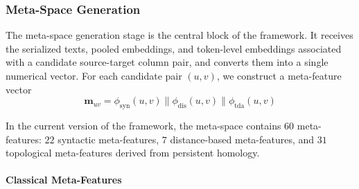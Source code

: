 \documentclass[sigconf, nonacm]{acmart}
\newcommand{\concat}{\mathbin{\|}}
\begin{document}
\subsubsection{\textbf{Meta-Space Generation}}

The meta-space generation stage is the central block of the framework. It receives the serialized texts, pooled embeddings, and token-level embeddings associated with a candidate source-target column pair, and converts them into a single numerical vector. For each candidate pair \((u,v)\), we construct a meta-feature vector
\[
\mathbf{m}_{uv}=
\phi_{\mathrm{syn}}(u,v)
\concat
\phi_{\mathrm{dis}}(u,v)
\concat
\phi_{\mathrm{tda}}(u,v)
\]

In the current version of the framework, the meta-space contains \(60\) meta-features: \(22\) syntactic meta-features, \(7\) distance-based meta-features, and \(31\) topological meta-features derived from persistent homology.

\paragraph{\textbf{Classical Meta-Features}}
\end{document}
